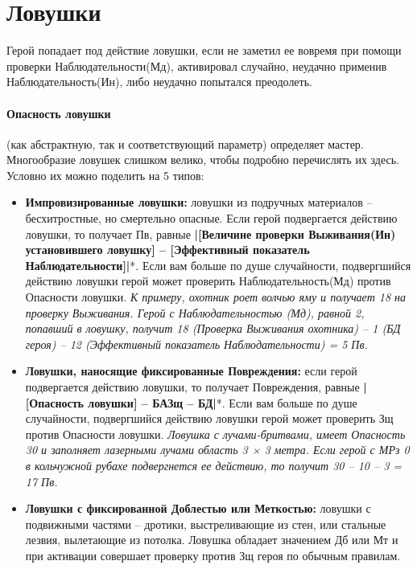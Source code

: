 \section{Ловушки}
Герой попадает под действие ловушки, если не заметил ее вовремя при помощи проверки Наблюдательности(Мд), активировал случайно, неудачно применив Наблюдательность(Ин), либо неудачно попытался преодолеть. 
\paragraph{Опасность ловушки} (как абстрактную, так и соответствующий параметр) определяет мастер. Многообразие ловушек слишком велико, чтобы подробно перечислять их здесь. Условно их можно поделить на 5 типов:
\begin{itemize}
  \item \textbf{Импровизированные ловушки:} ловушки из подручных материалов – бесхитростные, но смертельно опасные. Если герой подвергается действию ловушки, то получает Пв, равные \textbf{|[Величине проверки Выживания(Ин) установившего ловушку] – [Эффективный показатель Наблюдательности]|}*. 
    \newline *Если вам больше по душе случайности, подвергшийся действию ловушки герой может проверить Наблюдательность(Мд) против Опасности ловушки.
    \newline \textit{К примеру, охотник роет волчью яму и получает 18 на проверку Выживания. Герой с Наблюдательностью (Мд), равной 2, попавший в ловушку, получит 18 (Проверка Выживания охотника) – 1 (БД героя) – 12 (Эффективный показатель Наблюдательности) = 5 Пв.}
  \item \textbf{Ловушки, наносящие фиксированные Повреждения:} если герой подвергается действию ловушки, то получает Повреждения, равные \textbf{|[Опасность ловушки] – БАЗщ – БД|}*. 
    \newline *Если вам больше по душе случайности, подвергшийся действию ловушки герой может проверить Зщ против Опасности ловушки. 
    \newline \textit{Ловушка с лучами-бритвами, имеет Опасность 30 и заполняет лазерными лучами область 3 × 3 метра. Если герой с МРз 0 в кольчужной рубахе подвергнется ее действию, то получит 30 – 10 – 3 = 17 Пв.}
  \item \textbf{Ловушки с фиксированной Доблестью или Меткостью:} ловушки с подвижными частями – дротики, выстреливающие из стен, или стальные лезвия, вылетающие из потолка. Ловушка обладает значением Дб или Мт и при активации совершает проверку против Зщ героя по обычным правилам.

\end{itemize}
